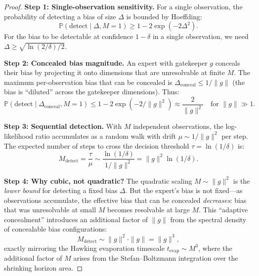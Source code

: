 \documentclass[12pt,a4paper]{article}
\theoremstyle{remark}
\newcommand{\Pbb}{\mathbb{P}}
\begin{document}
\begin{proof}
\noindent\textbf{Step 1: Single-observation sensitivity.}
For a single observation, the probability of detecting a bias of size $\Delta$ is bounded by Hoeffding:
\begin{equation}
  \Pbb(\text{detect} \mid \Delta, M=1) \geq 1 - 2\exp(-2\Delta^2).
\end{equation}
For the bias to be detectable at confidence $1-\delta$ in a single observation, we need $\Delta \geq \sqrt{\ln(2/\delta)/2}$.

\smallskip
\noindent\textbf{Step 2: Concealed bias magnitude.}
An expert with gatekeeper $g$ conceals their bias by projecting it onto dimensions that are unresolvable at finite $M$. The maximum per-observation bias that can be concealed is $\Delta_{\text{conceal}} \leq 1/\|g\|$ (the bias is ``diluted'' across the gatekeeper dimensions). Thus:
\begin{equation}
  \Pbb(\text{detect} \mid \Delta_{\text{conceal}}, M=1) \leq 1 - 2\exp(-2/\|g\|^2) \approx \frac{2}{\|g\|^2} \quad \text{for } \|g\| \gg 1.
\end{equation}

\smallskip
\noindent\textbf{Step 3: Sequential detection.}
With $M$ independent observations, the log-likelihood ratio accumulates as a random walk with drift $\mu \sim 1/\|g\|^2$ per step. The expected number of steps to cross the decision threshold $\tau = \ln(1/\delta)$ is:
\begin{equation}
  M_{\text{detect}} = \frac{\tau}{\mu} \sim \frac{\ln(1/\delta)}{1/\|g\|^2} = \|g\|^2 \ln(1/\delta).
\end{equation}

\smallskip
\noindent\textbf{Step 4: Why cubic, not quadratic?}
The quadratic scaling $M \sim \|g\|^2$ is the \emph{lower bound} for detecting a fixed bias $\Delta$. But the expert's bias is not fixed---as observations accumulate, the effective bias that can be concealed \emph{decreases}: bias that was unresolvable at small $M$ becomes resolvable at large $M$. This ``adaptive concealment'' introduces an additional factor of $\|g\|$ from the spectral density of concealable bias configurations:
\begin{equation}
  M_{\text{detect}} \sim \|g\|^2 \cdot \|g\| = \|g\|^3,
\end{equation}
exactly mirroring the Hawking evaporation timescale $t_{\text{evap}} \sim M^3$, where the additional factor of $M$ arises from the Stefan--Boltzmann integration over the shrinking horizon area.
\end{proof}
\end{document}
